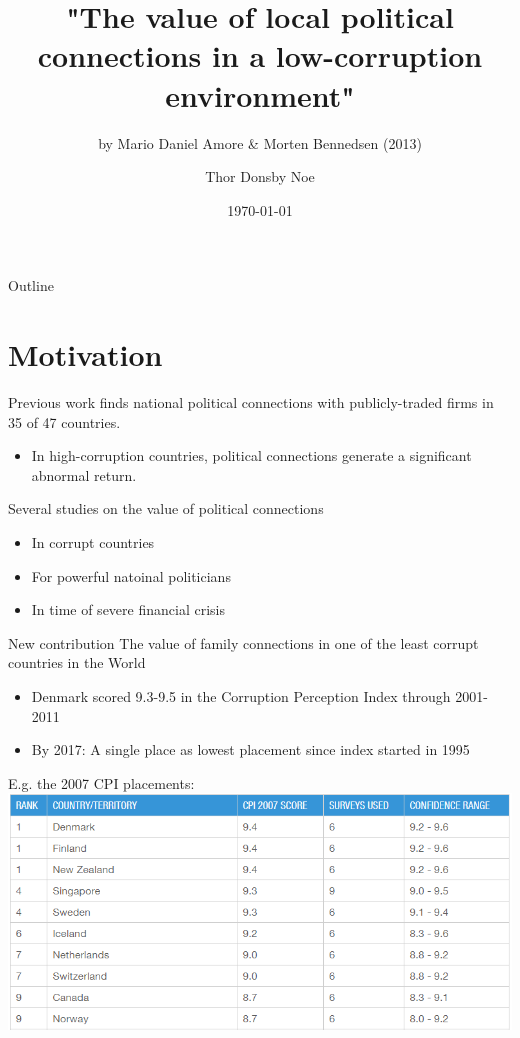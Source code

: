 \documentclass[8pt]{beamer}
\title{"The value of local political connections in a low-corruption environment"}
\subtitle{by Mario Daniel Amore \& Morten Bennedsen (2013)}
\date{\today}
\author{Thor Donsby Noe}
\institute{Regulation, Privatization \& Institutions \\
          w. Germà Bel}
\begin{document}
\maketitle


\begin{frame}{Outline}
  \tableofcontents
\end{frame}


\section{Motivation}


\begin{frame}{Previous work}
  \citet{faccio2006politically} finds national political connections with publicly-traded firms in 35 of 47 countries.
  \begin{itemize}
    \item In high-corruption countries, political connections generate a significant abnormal return.
  \end{itemize}
  Several studies on the value of political connections
  \begin{itemize}
    \item In corrupt countries
    \item For powerful natoinal politicians
    \item In time of severe financial crisis
  \end{itemize}
\end{frame}


\begin{frame}{ New contribution}
  The value of family connections in one of the least corrupt countries in the World
  \begin{itemize}
    \item Denmark scored 9.3-9.5 in the Corruption Perception Index through 2001-2011
    \item By 2017: A single  place as lowest placement since index started in 1995
  \end{itemize}
  E.g. the 2007 CPI placements:
  \includegraphics[width= \textwidth]{CPI.PNG}
\end{frame}
\end{document}

